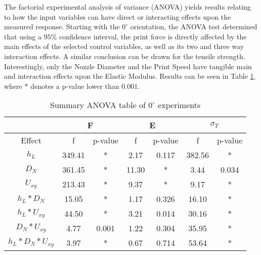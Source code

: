\documentclass[main.tex]{subfiles}
\begin{document}
The factorial experimental analysis of variance (ANOVA) yields results relating to how the input variables can have direct or interacting effects upon the measured response. Starting with the $0^{\circ}$ orientation, the ANOVA test determined that using a $95\%$ confidence interval, the print force is directly affected by the main effects of the selected control variables, as well as its two and three way interaction effects. A similar conclusion can be drawn for the tensile strength. Interestingly, only the Nozzle Diameter and the Print Speed have tangible main and interaction effects upon the Elastic Modulus. Results can be seen in Table \ref{tab:anova_0}, where $*$ denotes a p-value lower than $0.001$.

\begin{table}[!htbp]
	\renewcommand{\arraystretch}{1.5}
	\centering
	\caption{Summary ANOVA table of $0^{\circ}$ experiments}
	\label{tab:anova_0}
	\begin{tabular}{ccccccc}
	\hline
	& \multicolumn{2}{c}{F}                 & \multicolumn{2}{c}{E}                & \multicolumn{2}{c}{$\sigma_{T}$} \\ \hline
	\multicolumn{1}{c|}{Effect}        & f      & \multicolumn{1}{c|}{p-value} & f     & \multicolumn{1}{c|}{p-value} & f              & p-value         \\
	\multicolumn{1}{c|}{$h_{L}$}            & 349.41 & \multicolumn{1}{c|}{*}       & 2.17  & \multicolumn{1}{c|}{0.117}   & 382.56         & *               \\
	\multicolumn{1}{c|}{$D_{N}$}       & 361.45 & \multicolumn{1}{c|}{*}       & 11.30 & \multicolumn{1}{c|}{*}       & 3.44           & 0.034           \\
	\multicolumn{1}{c|}{$U_{xy}$}            & 213.43 & \multicolumn{1}{c|}{*}       & 9.37  & \multicolumn{1}{c|}{*}       & 9.17           & *               \\
	\multicolumn{1}{c|}{$h_{L}*D_{N}$}    & 15.05  & \multicolumn{1}{c|}{*}       & 1.17  & \multicolumn{1}{c|}{0.326}   & 16.10          & *               \\
	\multicolumn{1}{c|}{$h_{L}*U_{xy}$}       & 44.50  & \multicolumn{1}{c|}{*}       & 3.21  & \multicolumn{1}{c|}{0.014}   & 30.16          & *               \\
	\multicolumn{1}{c|}{$D_{N}*U_{xy}$}    & 4.77   & \multicolumn{1}{c|}{0.001}   & 1.22  & \multicolumn{1}{c|}{0.304}   & 35.95          & *               \\
	\multicolumn{1}{c|}{$h_{L}*D_{N}*U_{xy}$} & 3.97   & \multicolumn{1}{c|}{*}       & 0.67  & \multicolumn{1}{c|}{0.714}   & 53.64          & *               \\ \hline
\end{tabular}
\end{table} 
\end{document}

